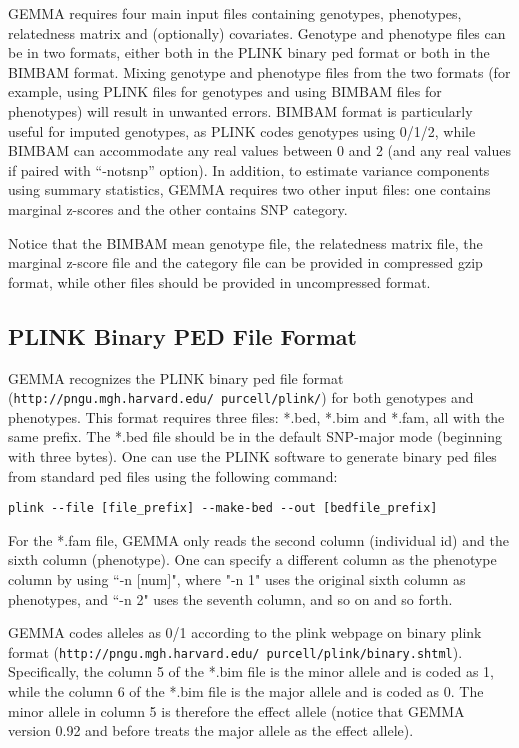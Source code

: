 \documentclass[11pt]{article}
\providecommand{\url}[1]{\texttt{#1}}
\begin{document}
GEMMA requires four main input files containing genotypes, phenotypes,
relatedness matrix and (optionally) covariates. Genotype and phenotype
files can be in two formats, either both in the PLINK binary ped
format or both in the BIMBAM format. Mixing genotype and phenotype
files from the two formats (for example, using PLINK files for
genotypes and using BIMBAM files for phenotypes) will result in
unwanted errors. BIMBAM format is particularly useful for imputed
genotypes, as PLINK codes genotypes using 0/1/2, while BIMBAM can
accommodate any real values between 0 and 2 (and any real values if
paired with ``-notsnp'' option). In addition, to estimate variance
components using summary statistics, GEMMA requires two other input
files: one contains marginal z-scores and the other contains SNP
category.

Notice that the BIMBAM mean genotype file, the relatedness matrix
file, the marginal z-score file and the category file can be provided
in compressed gzip format, while other files should be provided in
uncompressed format.

\subsection{PLINK Binary PED File Format}

GEMMA recognizes the PLINK binary ped file format
(\url{http://pngu.mgh.harvard.edu/~purcell/plink/})
\cite{Purcell:2007} for both genotypes and phenotypes. This format
requires three files: *.bed, *.bim and *.fam, all with the same
prefix. The *.bed file should be in the default SNP-major mode
(beginning with three bytes). One can use the PLINK software to
generate binary ped files from standard ped files using the following
command:
%
\begin{verbatim}
plink --file [file_prefix] --make-bed --out [bedfile_prefix]
\end{verbatim}
%
For the *.fam file, GEMMA only reads the second column (individual id)
and the sixth column (phenotype). One can specify a different column
as the phenotype column by using ``-n [num]", where "-n 1" uses the
original sixth column as phenotypes, and ``-n 2" uses the seventh
column, and so on and so forth.

GEMMA codes alleles as 0/1 according to the plink webpage on binary
plink format
(\url{http://pngu.mgh.harvard.edu/~purcell/plink/binary.shtml}). Specifically,
the column 5 of the *.bim file is the minor allele and is coded as 1,
while the column 6 of the *.bim file is the major allele and is coded
as 0. The minor allele in column 5 is therefore the effect allele
(notice that GEMMA version 0.92 and before treats the major allele as
the effect allele).
\end{document}
